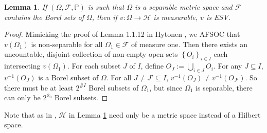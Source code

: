 \documentclass{article}
\numberwithin{theorem}{section}
\newtheorem{lemma}{Lemma}
\numberwithin{lemma}{section}
\numberwithin{definition}{section}
\numberwithin{assumption}{section}
\numberwithin{proposition}{section}
\numberwithin{remark}{section}
\newtheorem{corollary}{Corollary}
\numberwithin{corollary}{section}
\numberwithin{conjecture}{section}
\numberwithin{example}{section}
\newcommand{\bset}[1]{\left \lbrace #1 \right \rbrace}
\newcommand{\CH}{\mathcal H}
\begin{document}
\begin{multicols*}{2}

 \begin{lemma} 
 \label{measurable functions on separable metric spaces are ESV} If $(\Omega, \mathcal F, \mathbb P)$ is such that $\Omega$ is a separable metric space and $\mathcal F$ contains the Borel sets of $\Omega$, then if $v: \Omega \to \mathcal H$ is measurable, $v$ is ESV. 
 \end{lemma}

\begin{proof}
    Mimicking the proof of Lemma 1.1.12 in Hytonen \cite{hytonen2016}, we AFSOC that  $v(\Omega_1)$ is non-separable for all $\Omega_1 \in \mathcal F$ of measure one. Then there exists an uncountable, disjoint collection of non-empty open sets $\bset{O_i}_{i\in I} $ each intersecting $v(\Omega_1)$. For each subset $J$ of $I$, define $O_J := \bigcup_{i \in J} O_i$. For any $J \subseteq I$, $v^{-1}(O_J)$ is a Borel subset of $\Omega$. For all $J \neq J' \subseteq I$, $v^{-1}(O_J) \neq v^{-1}(O_{J'})$. So there must be at least $2^{\#I}$ Borel subsets of $\Omega_1$, but since $\Omega_1$ is separable, there can only be $2^{\aleph_0}$ Borel subsets. 
\end{proof}

Note that as in \cite{koumoullis1981on}, $\CH$ in Lemma \ref{measurable functions on separable metric spaces are ESV} need only be a metric space instead of a Hilbert space. 

\end{multicols*}
\end{document}
